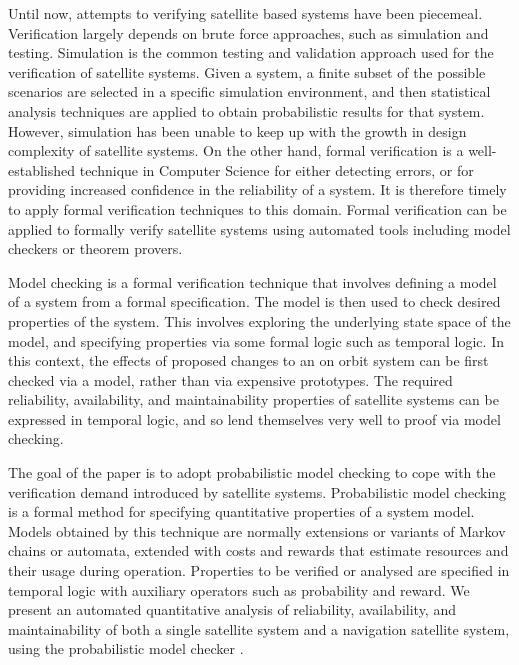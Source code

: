 \documentclass[preprint,12pt]{qrei}
\begin{document}
Until now, attempts to verifying satellite based systems have been piecemeal. Verification largely depends on brute force approaches, such as simulation and testing. Simulation is the common testing and validation approach used for the verification of satellite systems. Given a system, a finite subset of the possible scenarios are selected in a specific simulation environment, and then statistical analysis techniques are applied to obtain probabilistic results for that system. However, simulation has been unable to keep up with the growth in design complexity of satellite systems. On the other hand, formal verification is a well-established technique in Computer Science for either detecting errors, or for providing increased confidence in the reliability of a system. It is therefore timely to apply formal verification techniques to this domain. Formal verification can be applied to formally verify satellite systems using automated tools including model checkers or theorem provers.

Model checking is a formal verification technique that involves defining a model of a system from a formal specification. The model is then used to check desired properties of the system. This involves exploring the underlying state space of the model, and specifying properties via some formal logic such as temporal logic. In this context, the effects of proposed changes to an on orbit system can be first checked via a model, rather than via expensive prototypes. The required reliability, availability, and maintainability properties of satellite systems can be expressed in temporal logic, and so lend themselves very well to proof via model checking.

The goal of the paper is to adopt probabilistic model checking to cope with the verification demand introduced by satellite systems. Probabilistic model checking is a formal method for specifying quantitative properties of a system model. Models obtained by this technique are normally extensions or variants of Markov chains or automata, extended with costs and rewards that estimate resources and their usage during operation. Properties to be verified or analysed are specified in temporal logic with auxiliary operators such as probability and reward. We present an automated quantitative analysis of reliability, availability, and maintainability of both a single satellite system and a navigation satellite system, using the probabilistic model checker  \cite{KNP09}.
\end{document}
